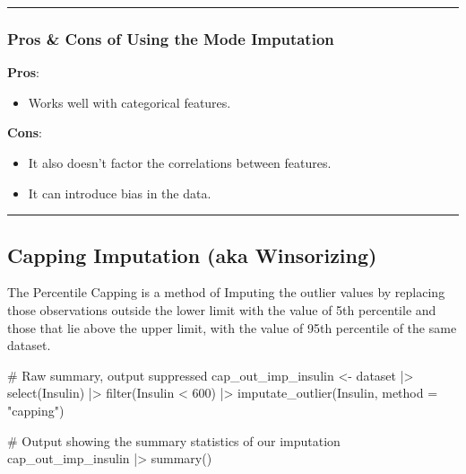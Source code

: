 \documentclass[
  letterpaper,
  DIV=11,
  numbers=noendperiod]{scrreprt}
\newenvironment{Shaded}{\begin{snugshade}}{\end{snugshade}}
\newcommand{\AttributeTok}[1]{\textcolor[rgb]{0.40,0.45,0.13}{#1}}
\newcommand{\CommentTok}[1]{\textcolor[rgb]{0.37,0.37,0.37}{#1}}
\newcommand{\DecValTok}[1]{\textcolor[rgb]{0.68,0.00,0.00}{#1}}
\newcommand{\FunctionTok}[1]{\textcolor[rgb]{0.28,0.35,0.67}{#1}}
\newcommand{\NormalTok}[1]{\textcolor[rgb]{0.00,0.23,0.31}{#1}}
\newcommand{\OtherTok}[1]{\textcolor[rgb]{0.00,0.23,0.31}{#1}}
\newcommand{\SpecialCharTok}[1]{\textcolor[rgb]{0.37,0.37,0.37}{#1}}
\newcommand{\StringTok}[1]{\textcolor[rgb]{0.13,0.47,0.30}{#1}}
\providecommand{\tightlist}{%
  \setlength{\itemsep}{0pt}\setlength{\parskip}{0pt}}\usepackage{longtable,booktabs,array}
\begin{document}
\begin{center}\rule{0.5\linewidth}{0.5pt}\end{center}

\hypertarget{pros-cons-of-using-the-mode-imputation}{%
\subsubsection{Pros \& Cons of Using the Mode
Imputation}\label{pros-cons-of-using-the-mode-imputation}}

\textbf{Pros}:

\begin{itemize}
\tightlist
\item
  Works well with categorical features.
\end{itemize}

\textbf{Cons}:

\begin{itemize}
\item
  It also doesn't factor the correlations between features.
\item
  It can introduce bias in the data.
\end{itemize}

\begin{center}\rule{0.5\linewidth}{0.5pt}\end{center}

\hypertarget{capping-imputation-aka-winsorizing}{%
\subsection{Capping Imputation (aka
Winsorizing)}\label{capping-imputation-aka-winsorizing}}

The Percentile Capping is a method of Imputing the outlier values by
replacing those observations outside the lower limit with the value of
5th percentile and those that lie above the upper limit, with the value
of 95th percentile of the same dataset.

\begin{Shaded}
\begin{Highlighting}[]
\CommentTok{\# Raw summary, output suppressed}
\NormalTok{cap\_out\_imp\_insulin }\OtherTok{\textless{}{-}}\NormalTok{ dataset }\SpecialCharTok{|\textgreater{}}
  \FunctionTok{select}\NormalTok{(Insulin) }\SpecialCharTok{|\textgreater{}}
  \FunctionTok{filter}\NormalTok{(Insulin }\SpecialCharTok{\textless{}} \DecValTok{600}\NormalTok{) }\SpecialCharTok{|\textgreater{}}
  \FunctionTok{imputate\_outlier}\NormalTok{(Insulin, }\AttributeTok{method =} \StringTok{"capping"}\NormalTok{)}

\CommentTok{\# Output showing the summary statistics of our imputation}
\NormalTok{cap\_out\_imp\_insulin }\SpecialCharTok{|\textgreater{}}
  \FunctionTok{summary}\NormalTok{()}
\end{Highlighting}
\end{Shaded}
\end{document}
